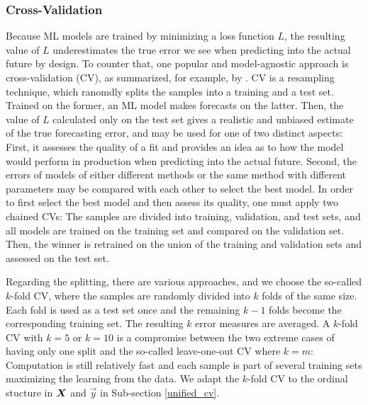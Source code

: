 \subsubsection{Cross-Validation}
\label{cv}

Because ML models are trained by minimizing a loss function $L$, the
    resulting value of $L$ underestimates the true error we see when
    predicting into the actual future by design.
To counter that, one popular and model-agnostic approach is cross-validation
    (CV), as summarized, for example, by \cite{hastie2013}.
CV is a resampling technique, which ranomdly splits the samples into a
    training and a test set.
Trained on the former, an ML model makes forecasts on the latter.
Then, the value of $L$ calculated only on the test set gives a realistic and
    unbiased estimate of the true forecasting error, and may be used for one
    of two distinct aspects:
First, it assesses the quality of a fit and provides an idea as to how the
    model would perform in production when predicting into the actual future.
Second, the errors of models of either different methods or the same method
    with different parameters may be compared with each other to select the
    best model.
In order to first select the best model and then assess its quality, one must
    apply two chained CVs:
The samples are divided into training, validation, and test sets, and all
    models are trained on the training set and compared on the validation set.
Then, the winner is retrained on the union of the training and validation
    sets and assessed on the test set.

Regarding the splitting, there are various approaches, and we choose the
    so-called $k$-fold CV, where the samples are randomly divided into $k$
    folds of the same size.
Each fold is used as a test set once and the remaining $k-1$ folds become
    the corresponding training set.
The resulting $k$ error measures are averaged.
A $k$-fold CV with $k=5$ or $k=10$ is a compromise between the two extreme
    cases of having only one split and the so-called leave-one-out CV
    where $k = m$: Computation is still relatively fast and each sample is
    part of several training sets maximizing the learning from the data.
We adapt the $k$-fold CV to the ordinal stucture in $\bm{X}$ and $\vec{y}$ in
    Sub-section \ref{unified_cv}.
